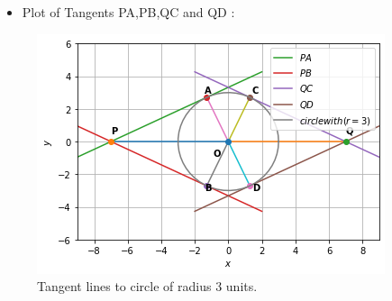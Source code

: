 \documentclass[journal,12pt,twocolumn]{IEEEtran}
\begin{document}
\begin{itemize}
\item Plot of Tangents PA,PB,QC and QD :
\end{itemize}
\begin{figure}[ht]
    \centering
    \includegraphics[width=\columnwidth]{FIGURE3.png}
    \caption{Tangent lines to circle of radius 3 units.}
    \label{fig:Tangent lines to circle of radius 3 units.}
\end{figure}    
\end{document}
